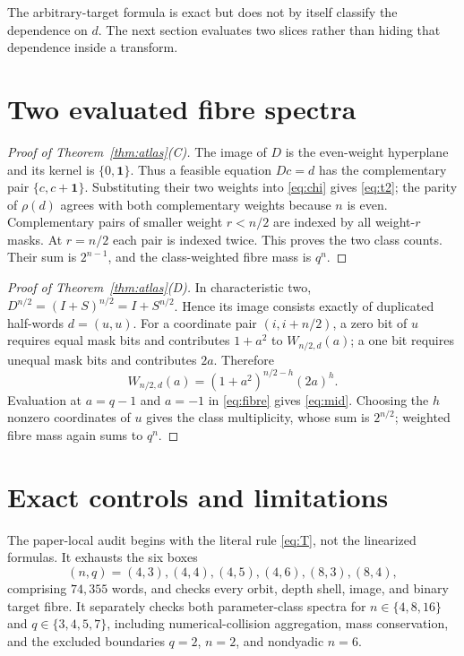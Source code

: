 \documentclass[a4paper,10pt]{amsart}
\theoremstyle{remark}
\newcommand{\one}{\boldsymbol 1}
\begin{document}
The arbitrary-target formula is exact but does not by itself classify the
dependence on $d$.  The next section evaluates two slices rather than hiding
that dependence inside a transform.

\section{Two evaluated fibre spectra}

\begin{proof}[Proof of Theorem~\ref{thm:atlas}(C)]
The image of $D$ is the even-weight hyperplane and its kernel is
$\{0,\one\}$.  Thus a feasible equation $Dc=d$ has the complementary pair
$\{c,c+\one\}$.  Substituting their two weights into
\eqref{eq:chi} gives \eqref{eq:t2}; the parity of $\rho(d)$ agrees with both
complementary weights because $n$ is even.  Complementary pairs of smaller
weight $r<n/2$ are indexed by all weight-$r$ masks.  At $r=n/2$ each pair is
indexed twice.  This proves the two class counts.  Their sum is $2^{n-1}$,
and the class-weighted fibre mass is $q^n$.
\end{proof}

\begin{proof}[Proof of Theorem~\ref{thm:atlas}(D)]
In characteristic two,
$D^{n/2}=(I+S)^{n/2}=I+S^{n/2}$.  Hence its image consists exactly of
duplicated half-words $d=(u,u)$.  For a coordinate pair
$(i,i+n/2)$, a zero bit of $u$ requires equal mask bits and contributes
$1+a^2$ to $W_{n/2,d}(a)$; a one bit requires unequal mask bits and
contributes $2a$.  Therefore
\[
 W_{n/2,d}(a)=(1+a^2)^{n/2-h}(2a)^h.
\]
Evaluation at $a=q-1$ and $a=-1$ in \eqref{eq:fibre} gives
\eqref{eq:mid}.  Choosing the $h$ nonzero coordinates of $u$ gives the class
multiplicity, whose sum is $2^{n/2}$; weighted fibre mass again sums to
$q^n$.
\end{proof}

\section{Exact controls and limitations}

The paper-local audit begins with the literal rule \eqref{eq:T}, not the
linearized formulas.  It exhausts the six boxes
\[
 (n,q)=(4,3),(4,4),(4,5),(4,6),(8,3),(8,4),
\]
comprising $74{,}355$ words, and checks every orbit, depth shell, image, and
binary target fibre.  It separately checks both parameter-class spectra for
$n\in\{4,8,16\}$ and $q\in\{3,4,5,7\}$, including numerical-collision
aggregation, mass conservation, and the excluded boundaries $q=2$, $n=2$,
and nondyadic $n=6$.
\end{document}
